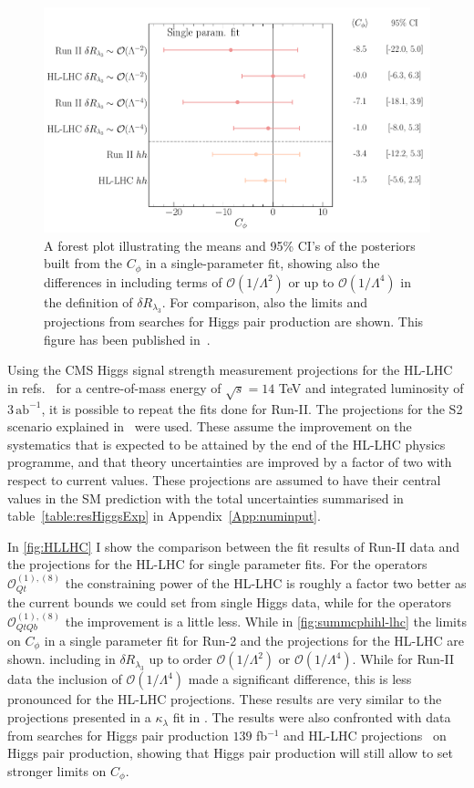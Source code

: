 \begin{figure}
	\begin{center}
		\includegraphics[width=0.75\linewidth]{fig/uebeblick_forest_cphi_singleparam}
	\end{center}
	\caption{A forest plot illustrating the means and 95\% CI's of the posteriors built from the  $C_\phi$  in a single-parameter fit, showing also the differences in including terms of $\mathcal{O}(1/\Lambda^2)$ or up to $\mathcal{O}(1/\Lambda^4)$ in the definition of $\delta R_{\lambda_3}$. For comparison, also the limits and projections from searches for Higgs pair production are shown. This figure has been published in~\cite{Alasfar:2022zyr}.  \label{fig:summcphihl-lhc}  }
\end{figure}
Using the CMS Higgs signal strength measurement projections for the HL-LHC in refs.~\cite{CMS-PAS-FTR-18-011,twiki} for a centre-of-mass energy of $\sqrt{s}=14$ TeV and integrated luminosity of $ 3\, \mathrm{ab}^{-1}$, it is possible to repeat the fits done for Run-II.   The projections for the S2 scenario explained in~\cite{Cepeda:2019klc} were used. These assume the improvement on the systematics that is expected to be attained by the end of the HL-LHC physics programme, and that theory uncertainties are improved by a factor of two with respect to current values.  These projections are assumed to have their central values in the SM prediction with the total uncertainties summarised in table~\ref{table:resHiggsExp} in Appendix~\ref{App:numinput}.

In \autoref{fig:HLLHC} I show the comparison between the fit results of Run-II data  and the projections for the HL-LHC for single parameter fits. For the operators $\mathcal{O}_{Qt}^{(1),(8)}$ the constraining power of the HL-LHC is roughly a factor two better as the current bounds we could set from single Higgs data, while for the operators $\mathcal{O}_{QtQb}^{(1),(8)}$ the improvement is a little less.
While in \autoref{fig:summcphihl-lhc}  the limits on $C_{\phi}$ in a single parameter fit for Run-2 and the projections for the HL-LHC are shown.
including in $\delta R_{\lambda_3}$ up to order $\mathcal{O}(1/\Lambda^2)$ or $\mathcal{O}(1/\Lambda^4)$. While for Run-II data the inclusion of $\mathcal{O}(1/\Lambda^4)$ made a significant difference, this is less pronounced for the HL-LHC projections. These results are very similar to the projections presented in a $\kappa_{\lambda}$ fit in \cite{DiMicco:2019ngk}. 
The results were also confronted  with data from searches for Higgs pair production $139$ fb$^{-1}$ \cite{ATLAS:2021jki}  and HL-LHC projections~\cite{CMS:2018ccd} on Higgs pair production, showing that Higgs pair production will still allow to set stronger limits on $C_{\phi}$. 
